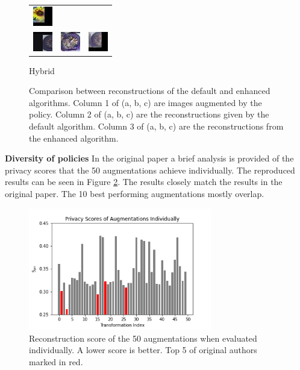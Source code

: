 \begin{figure}[h]
\begin{subtable}{.33\linewidth}
{\begin{tabular}{ l l l }
             \includegraphics[width = 24pt]{enhimagesHybrid/rec_77.jpg} \\
             \includegraphics[width = 24pt]{enhimagesHybrid/ori_91.jpg} & \includegraphics[width = 24pt]{defimagesHybrid/rec_91.jpg} &
             \includegraphics[width = 24pt]{enhimagesHybrid/rec_91.jpg} \\
        \end{tabular}}
        \caption{Hybrid}%
    \end{subtable}%
    \endgroup
    \caption{Comparison between reconstructions of the default and enhanced algorithms. Column 1 of (a, b, c) are images augmented by the policy. Column 2 of (a, b, c) are the reconstructions given by the default algorithm. Column 3 of (a, b, c) are the reconstructions from the enhanced algorithm. }
    \label{fig:attack}
\end{figure}

\textbf{Diversity of policies}
In the original paper a brief analysis is provided of the privacy scores that the 50 augmentations achieve individually. The reproduced results can be seen in Figure \ref{fig:individual}. The results closely match the results in the original paper. The 10 best performing augmentations mostly overlap.

\begin{figure}[htp]
    \centering
    \includegraphics[width=8cm]{pics/policy_reconstruction_individual_fixed.png}
    \caption{Reconstruction score of the 50 augmentations when evaluated individually. A lower score is better. Top 5 of original authors marked in red.}
    \label{fig:individual}
\end{figure}

